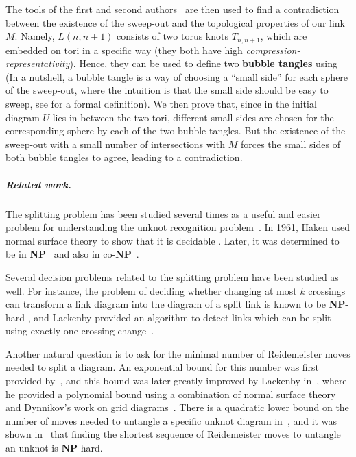 \documentclass[10pt,a4paper]{amsart}
\begin{document}
The tools of the first and second authors~\cite{Lunel_spherewidth_out} are then used to find a contradiction between the existence of the sweep-out and the topological properties of our link $M$. Namely, $L(n,n+1)$ consists of two torus knots $T_{n,n+1}$, which are embedded on tori in a specific way (they both have high \emph{compression-representativity}). Hence, they can be used to define two \textbf{bubble tangles} using \cite[Theorem~1.2]{Lunel_spherewidth_out} (In a nutshell, a bubble tangle is a way of choosing a ``small side'' for each sphere of the sweep-out, where the intuition is that the small side should be easy to sweep, see  for a formal definition). We then prove that, since in the initial diagram $U$ lies in-between the two tori, different small sides are chosen for the corresponding sphere by each of the two bubble tangles. But the existence of the sweep-out with a small number of intersections with $M$ forces the small sides of both bubble tangles to agree, leading to a contradiction.

\subparagraph*{Related work.}
The splitting problem has been studied several times as a useful and easier problem for understanding the unknot recognition problem~\cite{Dynnikov_arc, Lackenby_Poly_bound}. In 1961, Haken used normal surface theory to show that it is decidable \cite{haken_normal_surface}. Later, it was determined to be in \textbf{NP}~\cite{Hass_trivial_NP} and also in co-\textbf{NP}~\cite[Theorem~1.6]{Lackenby_co-NP}. 

Several decision problems related to the splitting problem have been studied as well. For instance, the problem of deciding whether changing at most $k$ crossings can transform a link diagram into the diagram of a split link is known to be \textbf{NP}-hard \cite{Koenig_hardness}, and Lackenby provided an algorithm to detect links which can be split using exactly one crossing change~\cite{lackenby2021links}. 

Another natural question is to ask for the minimal number of Reidemeister moves needed to split a diagram. An exponential bound for this number was first provided by~\cite{Hayashi_upper_unlink}, and this bound was later greatly improved by Lackenby in~\cite{Lackenby_Poly_bound}, where he provided a polynomial bound using a combination of normal surface theory~\cite{Hass_trivial_NP} and Dynnikov's work on grid diagrams~\cite{Dynnikov_arc}. There is a quadratic lower bound on the number of moves needed to untangle a specific unknot diagram in~\cite{hass2010unknot}, and it was shown in~\cite{unbearable_SoCG, unbearable} that finding the shortest sequence of Reidemeister moves to untangle an unknot is \textbf{NP}-hard.
\end{document}

